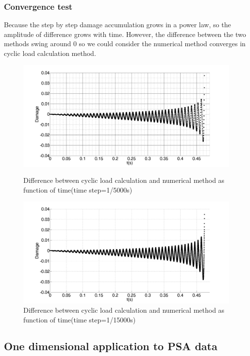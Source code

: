 \documentclass[xcolor=table]{Bredelebeamer}
\begin{document}
\begin{frame}
	\frametitle{Convergence test}
	Because the step by step damage accumulation grows in a power law, so the amplitude of difference grows with time. However, the difference between the two methods swing around 0 so we could consider the numerical method converges in cyclic load calculation method.
	\begin{figure}[htbp]
		\begin{minipage}[t]{0.48\linewidth}
	\centering
	\includegraphics[width=\textwidth]{figures//NCdiff100.png} 
	\caption{Difference between cyclic load calculation and numerical method as function of time(time step=1/5000s)}
	\label{NCdiff100}
		\end{minipage}
		\begin{minipage}[t]{0.48\linewidth}
	\centering
	\includegraphics[width=\textwidth]{figures//NCdiff300.png} 
	\caption{Difference between cyclic load calculation and numerical method as function of time(time step=1/15000s)}
	\label{NCdiff300}
		\end{minipage}
	\end{figure} 
\end{frame}	
\subsection{One dimensional application to PSA data}
\end{document}
